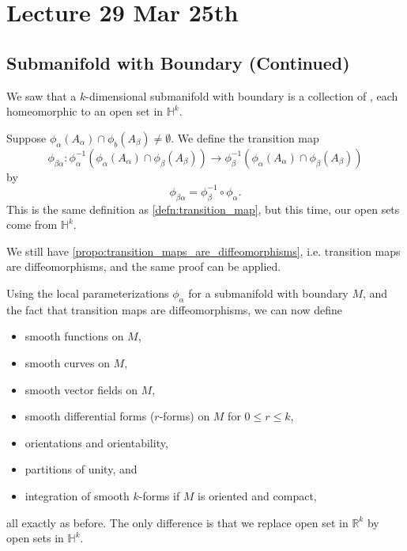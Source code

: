 \documentclass[notoc,notitlepage]{tufte-book}
\begin{document}


\chapter{Lecture 29 Mar 25th}%
\label{chp:lecture_29_mar_25th}

\section{Submanifold with Boundary (Continued)}%
\label{sec:submanifold_with_boundary_continued}

We saw that a $k$-dimensional submanifold with boundary is a collection of
, each homeomorphic to an open set in $\mathbb{H}^k$.

Suppose $\phi_\alpha(A_\alpha) \cap \phi_b(A_\beta) \neq \emptyset$. We define
the transition map
\begin{equation*}
  \phi_{\beta\alpha} : \phi_\alpha^{-1}(\phi_\alpha(A_\alpha) \cap
  \phi_\beta(A_\beta)) \to \phi_\beta^{-1}(\phi_\alpha(A_\alpha) \cap
  \phi_\beta(A_\beta))
\end{equation*}
by
\begin{equation*}
  \phi_{\beta\alpha} = \phi_\beta^{-1} \circ \phi_\alpha.
\end{equation*}
This is the same definition as \cref{defn:transition_map}, but this time, our
open sets come from $\mathbb{H}^k$.

We still have \cref{propo:transition_maps_are_diffeomorphisms}, i.e. 
transition maps are diffeomorphisms, and the same proof can be applied.

\begin{remark}
  Using the local parameterizations $\phi_\alpha$ for a submanifold with boundary
  $M$, and the fact that transition maps are diffeomorphisms, we can now define
  \begin{itemize}
    \item smooth functions on $M$,
    \item smooth curves on $M$, 
    \item smooth vector fields on $M$,
    \item smooth differential forms ($r$-forms) on $M$ for $0 \leq r \leq k$,
    \item orientations and orientability,
    \item partitions of unity, and
    \item integration of smooth $k$-forms if $M$ is oriented and compact,
  \end{itemize}
  all exactly as before. The only difference is that we replace open set in
  $\mathbb{R}^k$ by open sets in $\mathbb{H}^k$.
\end{remark}
\end{document}
